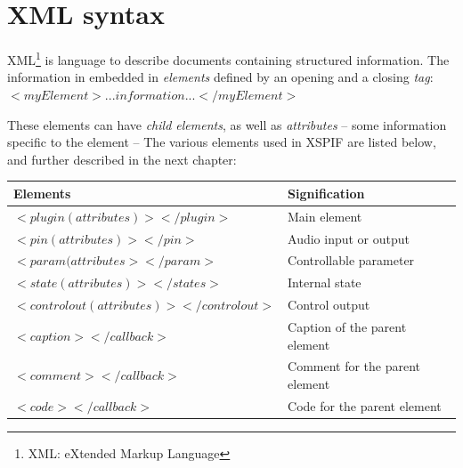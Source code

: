 \section{XML syntax}

\noindent XML\footnote{XML: eXtended Markup Language}\cite{Walsh} is  
language to describe documents containing structured information. 
The information in embedded in \emph{elements} defined by an opening 
and a closing \emph{tag}:\\
$<myElement> ... information ... </myElement>$

\noindent These elements can have \emph{child elements}, as well as
\emph{attributes} -- some information specific to the element --
The various elements used in XSPIF are listed below, and 
further described in the next chapter:

\begin{tabular}{l|l}
Elements                                     & Signification \\
\hline
$<plugin  (attributes)> </plugin>$           & Main element\\
$<pin  (attributes)> </pin>$                 & Audio input or output\\
$<param  (attributes> </param>$              & Controllable parameter\\
$<state  (attributes)> </states>$            & Internal state\\
$<controlout  (attributes)> </controlout>$   & Control output\\
$<caption> </callback>$                      & Caption of the parent element\\
$<comment> </callback>$                      & Comment for the parent element\\
$<code> </callback>$                         & Code for the parent element\\
\end{tabular}